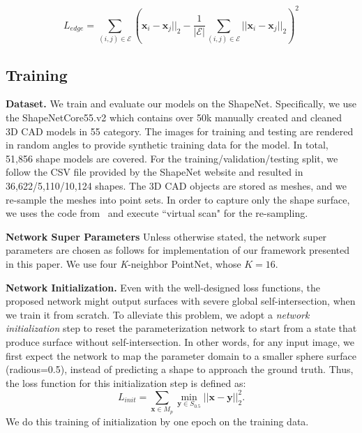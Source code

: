 \begin{equation}
\label{equ:edgereg}
L_{edge} = \sum_{(i,j)\in\mathcal{E}}(\mathbf{x}_i-\mathbf{x}_j||_2 - \frac{1}{|\mathcal{E}|}\sum_{(i,j)\in\mathcal{E} }||\mathbf{x}_i-\mathbf{x}_j||_2)^2
\end{equation}



\subsection{Training} 
\noindent \textbf{Dataset.}
We train and evaluate our models on the ShapeNet\cite{shapenetdata}. Specifically, we use the ShapeNetCore55.v2 which contains over 50k manually created and cleaned 3D CAD models in 55 category.
The images for training and testing are rendered in random angles to provide synthetic training data for the model. 
In total, 51,856 shape models are covered. 
For the training/validation/testing split, we follow the CSV file provided by the ShapeNet website and resulted in 36,622/5,110/10,124 shapes. 
The 3D CAD objects are stored as meshes, and we re-sample the meshes into point sets. 
In order to capture only the shape surface, we uses the code from~\cite{ocnn} and execute ``virtual scan" for the re-sampling.

\noindent \textbf{Network Super Parameters}
Unless otherwise stated, the network super parameters are chosen as follows for implementation of our framework presented in this paper. We use four \textit{K}-neighbor PointNet, whose $K=16$. 

\noindent \textbf{Network Initialization.}
Even with the well-designed loss functions, the proposed network might output surfaces with severe global self-intersection, when we train it from scratch.
%
To alleviate this problem, we adopt a \emph{network initialization} step to reset the parameterization network to start from a state that produce surface without self-intersection. In other words, for any input image, we first expect the network to map the parameter domain to a smaller sphere surface (radious=0.5), instead of predicting a shape to approach the ground truth.
Thus, the loss function for this initialization step is defined as:
\begin{equation}
\label{equ:init}
L_{init} = \sum_{\mathbf{x}\in M_p}\min_{\mathbf{y}\in S_{0.5}}||\mathbf{x} - \mathbf{y}||_2^2.
\end{equation} 
We do this training of initialization by one epoch on the training data. 



